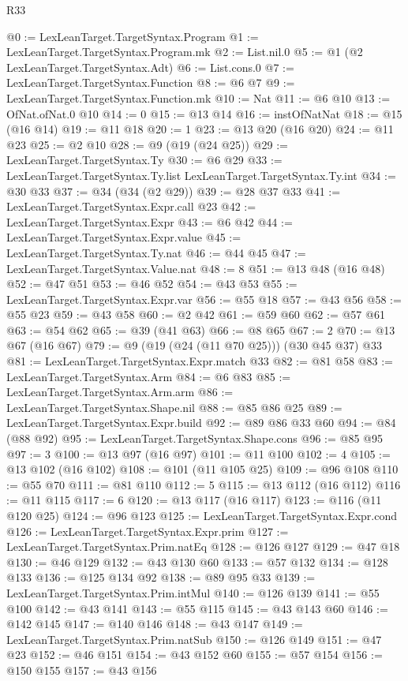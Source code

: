 \begin{lexlean}{R33}
\begin{coremodule}
{{{{{{{{@0 := LexLeanTarget.TargetSyntax.Program
@1 := LexLeanTarget.TargetSyntax.Program.mk
@2 := List.nil.{0}
@5 := @1 (@2 LexLeanTarget.TargetSyntax.Adt)
@6 := List.cons.{0}
@7 := LexLeanTarget.TargetSyntax.Function
@8 := @6 @7
@9 := LexLeanTarget.TargetSyntax.Function.mk
@10 := Nat
@11 := @6 @10
@13 := OfNat.ofNat.{0} @10
@14 := 0
@15 := @13 @14
@16 := instOfNatNat
@18 := @15 (@16 @14)
@19 := @11 @18
@20 := 1
@23 := @13 @20 (@16 @20)
@24 := @11 @23
@25 := @2 @10
@28 := @9 (@19 (@24 @25))
@29 := LexLeanTarget.TargetSyntax.Ty
@30 := @6 @29
@33 := LexLeanTarget.TargetSyntax.Ty.list LexLeanTarget.TargetSyntax.Ty.int
@34 := @30 @33
@37 := @34 (@34 (@2 @29))
@39 := @28 @37 @33
@41 := LexLeanTarget.TargetSyntax.Expr.call @23
@42 := LexLeanTarget.TargetSyntax.Expr
@43 := @6 @42
@44 := LexLeanTarget.TargetSyntax.Expr.value
@45 := LexLeanTarget.TargetSyntax.Ty.nat
@46 := @44 @45
@47 := LexLeanTarget.TargetSyntax.Value.nat
@48 := 8
@51 := @13 @48 (@16 @48)
@52 := @47 @51
@53 := @46 @52
@54 := @43 @53
@55 := LexLeanTarget.TargetSyntax.Expr.var
@56 := @55 @18
@57 := @43 @56
@58 := @55 @23
@59 := @43 @58
@60 := @2 @42
@61 := @59 @60
@62 := @57 @61
@63 := @54 @62
@65 := @39 (@41 @63)
@66 := @8 @65
@67 := 2
@70 := @13 @67 (@16 @67)
@79 := @9 (@19 (@24 (@11 @70 @25))) (@30 @45 @37) @33
@81 := LexLeanTarget.TargetSyntax.Expr.match @33
@82 := @81 @58
@83 := LexLeanTarget.TargetSyntax.Arm
@84 := @6 @83
@85 := LexLeanTarget.TargetSyntax.Arm.arm
@86 := LexLeanTarget.TargetSyntax.Shape.nil
@88 := @85 @86 @25
@89 := LexLeanTarget.TargetSyntax.Expr.build
@92 := @89 @86 @33 @60
@94 := @84 (@88 @92)
@95 := LexLeanTarget.TargetSyntax.Shape.cons
@96 := @85 @95
@97 := 3
@100 := @13 @97 (@16 @97)
@101 := @11 @100
@102 := 4
@105 := @13 @102 (@16 @102)
@108 := @101 (@11 @105 @25)
@109 := @96 @108
@110 := @55 @70
@111 := @81 @110
@112 := 5
@115 := @13 @112 (@16 @112)
@116 := @11 @115
@117 := 6
@120 := @13 @117 (@16 @117)
@123 := @116 (@11 @120 @25)
@124 := @96 @123
@125 := LexLeanTarget.TargetSyntax.Expr.cond
@126 := LexLeanTarget.TargetSyntax.Expr.prim
@127 := LexLeanTarget.TargetSyntax.Prim.natEq
@128 := @126 @127
@129 := @47 @18
@130 := @46 @129
@132 := @43 @130 @60
@133 := @57 @132
@134 := @128 @133
@136 := @125 @134 @92
@138 := @89 @95 @33
@139 := LexLeanTarget.TargetSyntax.Prim.intMul
@140 := @126 @139
@141 := @55 @100
@142 := @43 @141
@143 := @55 @115
@145 := @43 @143 @60
@146 := @142 @145
@147 := @140 @146
@148 := @43 @147
@149 := LexLeanTarget.TargetSyntax.Prim.natSub
@150 := @126 @149
@151 := @47 @23
@152 := @46 @151
@154 := @43 @152 @60
@155 := @57 @154
@156 := @150 @155
@157 := @43 @156
}}}}}}}}
\end{coremodule}
\end{lexlean}
